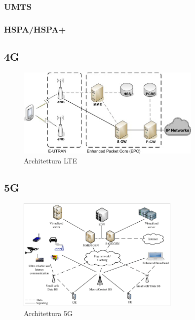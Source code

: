 \subsubsection{UMTS}


\subsubsection{HSPA/HSPA+}

\clearpage

\subsection{4G}
\begin{figure}[ht]
    \centering
    \includegraphics[width=0.8\textwidth]{images/4g-lte.jpg}
    \caption{Architettura LTE}
\end{figure}

\clearpage

\subsection{5G}
\begin{figure}[ht]
    \centering
    \includegraphics[width=0.7\textwidth]{images/5g.png}
    \caption{Architettura 5G}
\end{figure}